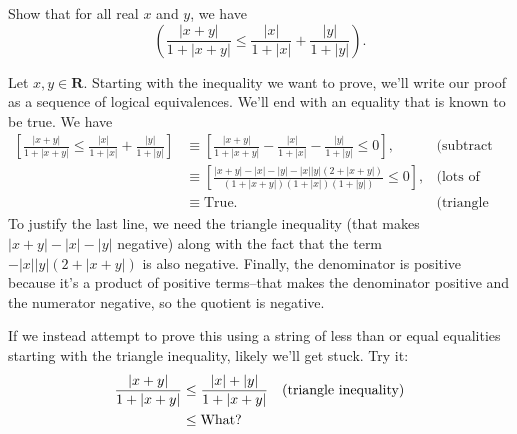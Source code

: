 \documentclass[fleqn, 12pt,answers]{exam}
\newcommand{\reals}{\mathbf{R}}
\newcommand\PM{{\sc pm}}
\newcommand{\quiz}{1}
\newcommand{\term}{Fall}
\newcommand{\due}{Saturday 27 August  at 11:59 \PM}
\begin{document}







\begin{questions} 

\question Show that for all real $x$ and $y$, we have
\[
    \left(\frac{|x+y|}{1 + |x+y|} \leq 
    \frac{|x|}{1 + |x|} + \frac{|y|}{1 + |y|} \right).
\]

\begin{solution}
Let $x,y \in \reals$.  Starting with the inequality we want to prove,
we'll write our proof as a sequence of logical equivalences. We'll 
end with an equality that is known to be true.  We have
\begin{align*}
    \left[\frac{|x+y|}{1 + |x+y|} \leq 
    \frac{|x|}{1 + |x|} + \frac{|y|}{1 + |y|} \right] &\equiv
    \left[\frac{|x+y|}{1 + |x+y|} - \frac{|x|}{1 + |x|} - \frac{|y|}{1 + |y|} \leq 0 \right],
      &\mbox{(subtract right side)} \\
      &\equiv \left[ \frac{|x+y| - |x| - |y| - |x| |y| (2 + |x+y|)}{(1 + |x+y|) (1 + |x|) 
      (1 + |y|) } \leq 0  \right], &\mbox{(lots of algebra)} \\
      &\equiv \mbox{True}. &\mbox{(triangle inequality)}
\end{align*}
To justify the last line, we need the triangle inequality (that makes 
$|x+y| - |x| - |y|$ negative) along with the fact that the term
$- |x| |y| (2 + |x+y|)$ is also negative. Finally, 
the denominator is positive because it's a product of
positive terms--that makes the denominator positive and the 
numerator negative, so the quotient is negative.
\end{solution}

If we instead attempt to prove this using a string of less than or equal
equalities starting with the triangle inequality, likely we'll get stuck. Try it:
\begin{align*}
  \frac{|x+y|}{1 + |x+y|} & \leq \frac{|x| + |y|}{1 + |x+y|} \hfill &\mbox{(triangle inequality)} \\
                          & \leq \mbox{What?}
\end{align*}
\end{questions}
\end{document}
